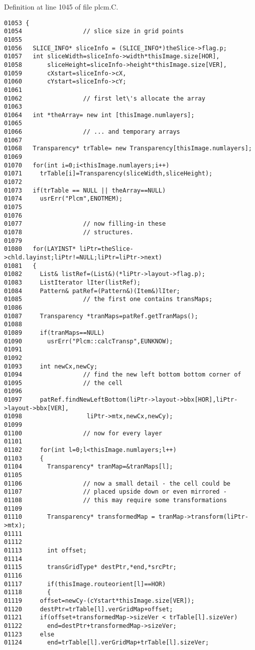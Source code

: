 Definition at line 1045 of file plcm.C.\small\begin{verbatim}01053 {
01054                 // slice size in grid points
01055 
01056   SLICE_INFO* sliceInfo = (SLICE_INFO*)theSlice->flag.p;
01057   int sliceWidth=sliceInfo->width*thisImage.size[HOR],
01058       sliceHeight=sliceInfo->height*thisImage.size[VER],
01059       cXstart=sliceInfo->cX,
01060       cYstart=sliceInfo->cY;
01061 
01062                 // first let\'s allocate the array
01063 
01064   int *theArray= new int [thisImage.numlayers];
01065 
01066                 // ... and temporary arrays
01067 
01068   Transparency* trTable= new Transparency[thisImage.numlayers];
01069 
01070   for(int i=0;i<thisImage.numlayers;i++)
01071     trTable[i]=Transparency(sliceWidth,sliceHeight);
01072 
01073   if(trTable == NULL || theArray==NULL)
01074     usrErr("Plcm",ENOTMEM);
01075 
01076 
01077                 // now filling-in these
01078                 // structures.
01079 
01080   for(LAYINST* liPtr=theSlice->chld.layinst;liPtr!=NULL;liPtr=liPtr->next)
01081   {
01082     List& listRef=(List&)(*liPtr->layout->flag.p);
01083     ListIterator lIter(listRef);
01084     Pattern& patRef=(Pattern&)(Item&)lIter;
01085                 // the first one contains transMaps;
01086     
01087     Transparency *tranMaps=patRef.getTranMaps();
01088     
01089     if(tranMaps==NULL)
01090       usrErr("Plcm::calcTransp",EUNKNOW);
01091 
01092 
01093     int newCx,newCy;
01094                 // find the new left bottom bottom corner of 
01095                 // the cell
01096 
01097     patRef.findNewLeftBottom(liPtr->layout->bbx[HOR],liPtr->layout->bbx[VER],
01098                  liPtr->mtx,newCx,newCy);
01099 
01100                 // now for every layer
01101 
01102     for(int l=0;l<thisImage.numlayers;l++)
01103     {
01104       Transparency* tranMap=&tranMaps[l];
01105 
01106                 // now a small detail - the cell could be 
01107                 // placed upside down or even mirrored -
01108                 // this may require some transformations
01109 
01110       Transparency* transformedMap = tranMap->transform(liPtr->mtx);
01111 
01112     
01113       int offset;
01114 
01115       transGridType* destPtr,*end,*srcPtr;
01116       
01117       if(thisImage.routeorient[l]==HOR)
01118       {
01119     offset=newCy-(cYstart*thisImage.size[VER]); 
01120     destPtr=trTable[l].verGridMap+offset;
01121     if(offset+transformedMap->sizeVer < trTable[l].sizeVer)
01122       end=destPtr+transformedMap->sizeVer;
01123     else
01124       end=trTable[l].verGridMap+trTable[l].sizeVer;

\end{verbatim}
